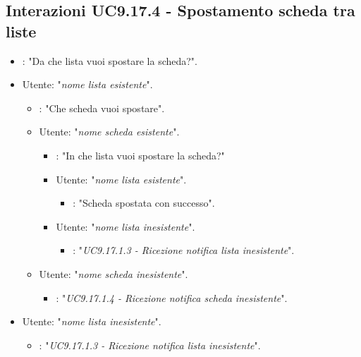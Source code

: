 \subsection{Interazioni  UC9.17.4 - Spostamento scheda tra liste }
 \begin{itemize}
        \item {}: "Da che lista vuoi spostare la scheda?".
        \item Utente: "{\it nome lista esistente}".
        \begin{itemize}
        \item {}: "Che scheda vuoi spostare".
       
        \item Utente: "{\it nome scheda esistente}".
        \begin{itemize}
        \item {}: "In che lista vuoi spostare la scheda?"
          \item Utente: "{\it nome lista esistente}".
          \begin{itemize}
              \item {}: "Scheda spostata con successo".
          \end{itemize}
           \item Utente: "{\it nome lista inesistente}".
           \begin{itemize}
        \item {}: "{\it UC9.17.1.3 - Ricezione notifica lista inesistente}".
        \end{itemize}
      \end{itemize}
      
     \item Utente: "{\it nome scheda inesistente}".
     \begin{itemize}
           \item {}: "{\it UC9.17.1.4 - Ricezione notifica scheda inesistente}".
           \end{itemize}
            \end{itemize}
        \item Utente: "{\it nome lista inesistente}".
           \begin{itemize}
        \item {}: "{\it UC9.17.1.3 - Ricezione notifica lista inesistente}".
           \end{itemize}
    \end{itemize}
